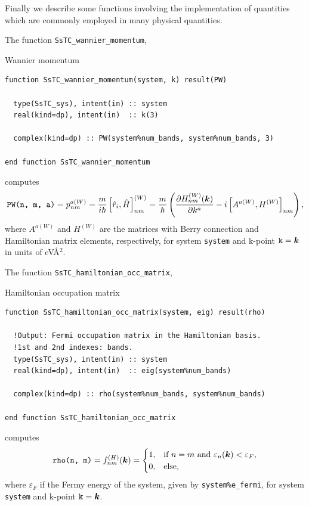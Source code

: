 \documentclass[10pt,a4paper]{article}
\begin{document}
Finally we describe some functions involving the implementation of quantities which are commonly employed in many physical quantities.

The function \verb|SsTC_wannier_momentum|,
\begin{codebox}{Wannier momentum}
\begin{lstlisting}[caption={Interface of ``Wannier momentum".},captionpos=b]
function SsTC_wannier_momentum(system, k) result(PW)

  type(SsTC_sys), intent(in) :: system
  real(kind=dp), intent(in)  :: k(3)

  complex(kind=dp) :: PW(system%num_bands, system%num_bands, 3)
  
end function SsTC_wannier_momentum
\end{lstlisting}
\end{codebox}
computes \cite{sakuraiModernQuantumMechanics2017, parkerDiagrammaticApproachNonlinear2019}
\begin{equation}
\verb|PW(n, m, a)| = p^{a(W)}_{nm} = \frac{m}{i\hbar}\left[\hat{r}_i, \hat{H}\right]^{(W)}_{nm}=\frac{m}{\hbar}\left(\frac{\partial H_{nm}^{(W)}(\bm{k})}{\partial k^a} - i\left[A^{a(W)},H^{(W)}\right]_{nm} \right),
\end{equation}
where $A^{a(W)}$ and $H^{(W)}$ are the matrices with Berry connection and Hamiltonian matrix elements, respectively, for system \verb|system| and k-point $\verb|k| = \bm{k}$ in units of eV\r{A}$^2$.

The function \verb|SsTC_hamiltonian_occ_matrix|,
\begin{codebox}{Hamiltonian occupation matrix}
\begin{lstlisting}[caption={Interface of ``Hamiltonian occupation matrix".},captionpos=b]
function SsTC_hamiltonian_occ_matrix(system, eig) result(rho)

  !Output: Fermi occupation matrix in the Hamiltonian basis.
  !1st and 2nd indexes: bands.
  type(SsTC_sys), intent(in) :: system
  real(kind=dp), intent(in)  :: eig(system%num_bands)

  complex(kind=dp) :: rho(system%num_bands, system%num_bands)
  
end function SsTC_hamiltonian_occ_matrix
\end{lstlisting}
\end{codebox}
computes
\begin{equation}
\verb|rho(n, m)| = f_{nm}^{(H)}(\bm{k}) = \begin{cases}
1, & \text{if }n = m \text{ and } \varepsilon_n(\bm{k})<\varepsilon_F, \\
0, &\text{else},
\end{cases}
\end{equation}
where $\varepsilon_F$ if the Fermy energy of the system, given by \verb|system%e_fermi|, for system \verb|system| and k-point $\verb|k| = \bm{k}$.
\end{document}
